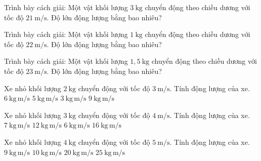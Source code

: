 \begin{bt}
Trình bày cách giải: Một vật khối lượng $3\ \mathrm{kg}$ chuyển động theo chiều dương với tốc độ $21\ \mathrm{m/s}$. Độ lớn động lượng bằng bao nhiêu?
\end{bt}

\begin{bt}
Trình bày cách giải: Một vật khối lượng $1\ \mathrm{kg}$ chuyển động theo chiều dương với tốc độ $22\ \mathrm{m/s}$. Độ lớn động lượng bằng bao nhiêu?
\end{bt}

\begin{bt}
Trình bày cách giải: Một vật khối lượng $1,5\ \mathrm{kg}$ chuyển động theo chiều dương với tốc độ $23\ \mathrm{m/s}$. Độ lớn động lượng bằng bao nhiêu?
\end{bt}

\begin{ex}
Xe nhỏ khối lượng $2\ \mathrm{kg}$ chuyển động với tốc độ $3\ \mathrm{m/s}$. Tính động lượng của xe.
\choice
{\True $6\ \mathrm{kg\,m/s}$}
{$5\ \mathrm{kg\,m/s}$}
{$3\ \mathrm{kg\,m/s}$}
{$9\ \mathrm{kg\,m/s}$}
\end{ex}

\begin{ex}
Xe nhỏ khối lượng $3\ \mathrm{kg}$ chuyển động với tốc độ $4\ \mathrm{m/s}$. Tính động lượng của xe.
\choice
{$7\ \mathrm{kg\,m/s}$}
{\True $12\ \mathrm{kg\,m/s}$}
{$6\ \mathrm{kg\,m/s}$}
{$16\ \mathrm{kg\,m/s}$}
\end{ex}

\begin{ex}
Xe nhỏ khối lượng $4\ \mathrm{kg}$ chuyển động với tốc độ $5\ \mathrm{m/s}$. Tính động lượng của xe.
\choice
{$9\ \mathrm{kg\,m/s}$}
{$10\ \mathrm{kg\,m/s}$}
{\True $20\ \mathrm{kg\,m/s}$}
{$25\ \mathrm{kg\,m/s}$}
\end{ex}

